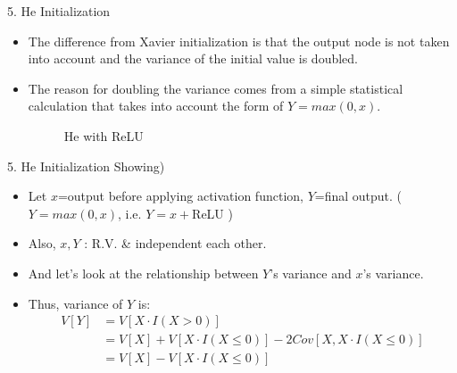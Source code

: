 \documentclass{beamer}
\begin{document}
	\begin{frame}{5. He Initialization}
		\begin{itemize}
			\item The difference from Xavier initialization is that the output node is not taken into account and the variance of the initial value is doubled.
			\item The reason for doubling the variance comes from a simple statistical calculation that takes into account the form of $Y = max(0,x)$.
			\vspace{10pt}
			\begin{figure}[h]
				\centering
				\quad
				\caption{He with ReLU}
				\label{fig:reluhe}
			\end{figure}
		\end{itemize}
	\end{frame}

	
	\begin{frame}{5. He Initialization}
		Showing)
		\begin{itemize}
			\item Let $x$=output before applying activation function, $Y$=final output. ($Y=max(0,x)$, i.e. $Y=x+$ReLU  ) 
			\item Also, $x,Y$ : R.V. \& independent each other. 
			\item And let's look at the relationship between $Y$'s variance and $x$'s variance. 
			\item Thus, variance of $Y$ is:
			\begin{align*}
			V[Y] &= V[X\cdot I(X>0)] \\ 
			&= V[X] + V[X\cdot I(X \le 0)] - 2Cov[X,X\cdot I(X \le 0)] \\
			&= V[X] - V[X\cdot I(X \le 0)]
			\end{align*}
		\end{itemize}
	\end{frame}	
	
\end{document}
